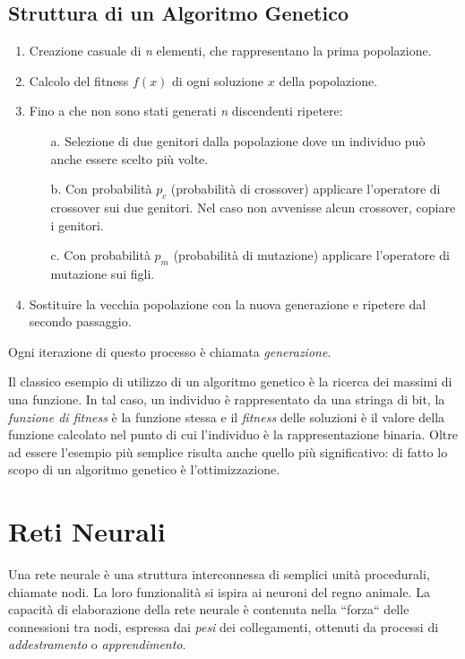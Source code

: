 \documentclass[12pt,a4paper]{report}
\begin{document}
\subsection{Struttura di un Algoritmo Genetico}

\begin{enumerate}
 \item Creazione casuale di \textit{n} elementi, che rappresentano la prima popolazione. 
 \item Calcolo del fitness $f(x)$ di ogni soluzione $x$ della popolazione.
 \item Fino a che non sono stati generati \textit{n} discendenti ripetere:
 \begin{enumerate}
  \item[a.] Selezione di due genitori dalla popolazione dove un individuo può anche essere scelto più volte.
  \item[b.] Con probabilità $p_{c}$ (probabilità di crossover) applicare l'operatore di crossover sui due genitori. Nel caso non avvenisse alcun crossover, copiare i genitori.
  \item[c.] Con probabilità $p_{m}$ (probabilità di mutazione) applicare l'operatore di mutazione sui figli.
 \end{enumerate}
 \item Sostituire la vecchia popolazione con la nuova generazione e ripetere dal secondo passaggio.
\end{enumerate}

Ogni iterazione di questo processo è chiamata \textit{generazione}.

Il classico esempio di utilizzo di un algoritmo genetico è la ricerca dei massimi di una funzione.
In tal caso, un individuo è rappresentato da una stringa di bit, la \textit{funzione di fitness} è la funzione stessa e il \textit{fitness} delle soluzioni è il valore della funzione calcolato nel punto di cui l'individuo è la rappresentazione binaria.
Oltre ad essere l'esempio più semplice risulta anche quello più significativo: di fatto lo scopo di un algoritmo genetico è l'ottimizzazione.  

\section{Reti Neurali}

Una rete neurale è una struttura interconnessa di semplici unità procedurali, chiamate nodi. La loro funzionalità si ispira ai neuroni del regno animale. La capacità di elaborazione della rete neurale è contenuta nella ``forza`` delle connessioni tra nodi, espressa dai \textit{pesi} dei collegamenti, ottenuti da processi di \textit{ addestramento} o \textit{apprendimento}. \cite{neural-net-gurney}
\end{document}
